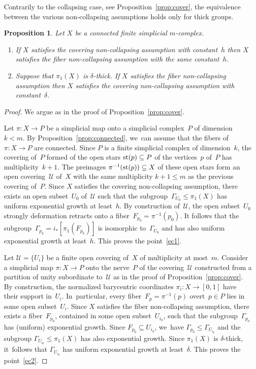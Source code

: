 \documentclass[10pt]{amsart}
\newtheorem{proposition}[theorem]{Proposition}
\theoremstyle{definition}
\begin{document}
Contrarily to the collapsing case, see Proposition~\ref{prop:cover}, the equivalence between the various non-collapsing assumptions holds only for thick groups.

\begin{proposition} \label{prop:exp.cover}
Let $X$ be a connected finite simplicial $m$\nobreakdash-complex.
\begin{enumerate}
\item If $X$ satisfies the covering non-collapsing assumption with constant~$h$ then $X$ satisfies the fiber non-collapsing assumption with the same constant~$h$. \label{ec1}
\item Suppose that $\pi_1(X)$ is $\delta$-thick.
If $X$ satisfies the fiber non-collapsing assumption then $X$ satisfies the covering non-collapsing assumption with constant~$\delta$. \label{ec2}
\end{enumerate}
\end{proposition}

\begin{proof}
We argue as in the proof of Proposition~\ref{prop:cover}.

Let $\pi:X \to P$ be a simplicial map onto a simplicial complex~$P$ of dimension~$k < m$.
By Proposition~\ref{prop:connected}, we~can assume that the fibers of~$\pi:X \to P$ are connected.
Since $P$ is a finite simplicial complex of dimension~$k$, the covering of~$P$ formed of the open stars ${\rm st}(p) \subseteq P$ of the vertices~$p$ of~$P$ has multiplicity~$k+1$.
The preimages $\pi^{-1}({\rm st}(p)) \subseteq X$ of these open stars form an open covering~$\mathcal{U}$ of~$X$ with the same multiplicity $k+1 \leq m$ as the previous covering of~$P$.
Since $X$ satisfies the covering non-collapsing assumption, there exists an open subset~$U_0$ of~$\mathcal{U}$ such that the subgroup~$\Gamma_{U_0} \leqslant \pi_1(X)$ has uniform exponential growth at least~$h$.
By construction of~$\mathcal{U}$, the open subset~$U_0$ strongly deformation retracts onto a fiber~$F_{p_0}=\pi^{-1}(p_0)$.
It follows that the subgroup~$\Gamma_{p_0} = i_*[\pi_1(F_{p_0})]$ is isomorphic to~$\Gamma_{U_0}$ and has also uniform exponential growth at least~$h$.
This proves the point~\eqref{ec1}.

Let $\mathcal{U}=\{U_i\}$ be a finite open covering of~$X$ of multiplicity at most~$m$.
Consider a simplicial map $\pi:X \to P$ onto the nerve~$P$ of the covering~$\mathcal{U}$ constructed from a partition of unity subordinate to~$\mathcal{U}$ as in the proof of Proposition~\ref{prop:cover}.
By construction, the normalized barycentric coordinates $\pi_i:X \to [0,1]$ have their support in~$U_i$. In~particular, every fiber~$F_p=\pi^{-1}(p)$ overt~$p \in P$ lies in some open subset~$U_i$.
Since $X$ satisfies the fiber non-collapsing assumption, there exists a fiber~$F_{p_0}$, contained in some open subset~$U_{i_0}$, such that the subgroup~$\Gamma_{p_0}$ has (uniform) exponential growth.
Since $F_{p_0} \subseteq U_{i_0}$, we~have $\Gamma_{p_0} \leqslant \Gamma_{U_{i_0}}$ and the subgroup $\Gamma_{U_{i_0}} \leqslant \pi_1(X)$ has also exponential growth.
Since $\pi_1(X)$ is $\delta$-thick, it~follows that $\Gamma_{U_{i_0}}$ has uniform exponential growth at least~$\delta$.
This proves the point~\eqref{ec2}.
\end{proof}
\end{document}
